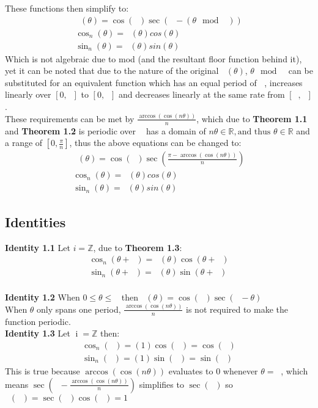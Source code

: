 \documentclass[11pt]{article}
\DeclareMathOperator{\custd}{\mathrm{d}_n}
\DeclareMathOperator{\custh}{\mathrm{h}_n}
\DeclareMathOperator{\custi}{\mathrm{i}}
\DeclareMathOperator{\period}{\frac{2\pi}{n}}
\DeclareMathOperator{\hp}{\frac{\pi}{n}}
\DeclareMathOperator{\iperiod}{\custi\frac{2\pi}{n}}
\begin{document}
These functions then simplify to:
\begin{gather*}
\custd(\theta)=\cos(\hp)\sec(\hp-(\theta\mod\period))\\
\cos_n(\theta)=\custd(\theta)cos(\theta)\\
\sin_n(\theta)=\custd(\theta)sin(\theta)
\end{gather*}
Which is not algebraic due to mod (and the resultant floor function behind it), yet it can be noted that due to the nature of the original \(\custh(\theta)\), \(\theta\mod\period\) can be substituted for an equivalent function which has an equal period of \(\period\), increases linearly over \([0,\hp]\) to \([0,\hp]\) and decreases linearly at the same rate from \([\hp,\period]\).\\
These requirements can be met by \(\frac{\arccos(\cos(n\theta))}{n}\), which due to \textbf{Theorem 1.1} and \textbf{Theorem 1.2} is periodic over \(\period\) has a domain of \(n\theta\in\mathbb{R},\text{and thus } \theta\in\mathbb{R}\) and a range of \([0,\frac{\pi}{n}]\), thus the above equations can be changed to:
\begin{gather*}
\custd(\theta)=\cos(\hp)\sec(\frac{\pi-\arccos(\cos(n\theta))}{n})\\
\cos_n(\theta)=\custd(\theta)cos(\theta)\\
\sin_n(\theta)=\custd(\theta)sin(\theta)
\end{gather*}

\subsection{Identities}
\textbf{Identity 1.1} Let \(i=\mathbb{Z}\), due to \textbf{Theorem 1.3}:
\begin{gather*}
\cos_n(\theta+\iperiod) = \custd(\theta)\cos(\theta+\iperiod)\\
\sin_n(\theta+\iperiod) = \custd(\theta)\sin(\theta+\iperiod)
\end{gather*} \\
\textbf{Identity 1.2} When \(0\leq\theta\leq\period\) then \(\custd(\theta)=\cos(\hp)\sec(\hp-\theta)\)\\
When \(\theta\) only spans one period, \(\frac{\arccos(\cos(n\theta))}{n}\) is not required to make the function periodic.\\
\textbf{Identity 1.3} Let \(\custi=\mathbb{Z}\) then:
\begin{gather*}
\cos_n(\iperiod) = (1)\cos(\iperiod)=\cos(\iperiod)\\
\sin_n(\iperiod) = (1)\sin(\iperiod)=\sin(\iperiod)
\end{gather*}
This is true because \(\arccos(\cos(n\theta))\) evaluates to 0 whenever \(\theta=\iperiod\), which means \(\sec(\hp-\frac{\arccos(\cos(n\theta))}{n})\) simplifies to \(\sec(\hp)\) so \(\custd(\iperiod)=\sec(\hp)\cos(\hp)=1\)
\end{document}
